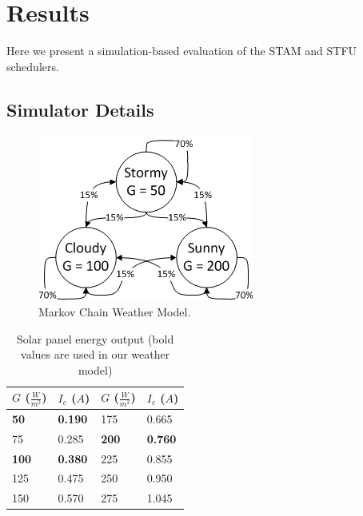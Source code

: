 \section{Results} \label{sec:simulation}

Here we present a simulation-based evaluation of the \textsc{STAM} and \textsc{STFU} schedulers. 

\subsection{Simulator Details }

\begin{figure}[htb]
\begin{center}
\label{fig:markov}
\caption{Markov Chain Weather Model.}
\includegraphics[scale=0.8]{markov.png}
\end{center}
\end{figure}
\begin{table}[h]
\begin{center}

\begin{tabular}{| l | l || l | l |}
\hline
\textbf{$G$ ($\frac{W}{m^2}$)} & \textbf{$I_c$ ($A$)} & \textbf{$G$ ($\frac{W}{m^2}$)} & \textbf{$I_c$ ($A$)} \\
\hline
\textbf{50} & \textbf{0.190} & 175 & 0.665 \\
75 & 0.285 & \textbf{200} & \textbf{0.760} \\
\textbf{100} & \textbf{0.380} & 225 & 0.855 \\
125 & 0.475 & 250 & 0.950 \\
150 & 0.570 & 275 & 1.045 \\
\hline
\end{tabular}
\end{center}
\label{tab:radiance}
\caption{Solar panel energy output (bold values are used in our weather model)}
\end{table}

